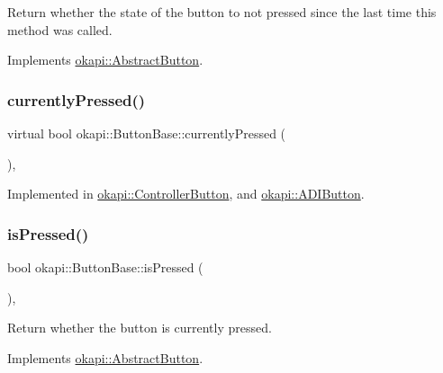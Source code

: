 Return whether the state of the button to not pressed since the last time this method was called. 

Implements \mbox{\hyperlink{classokapi_1_1AbstractButton_ab4f7a216d6d0a9d14bb89705df0327b3}{okapi\+::\+Abstract\+Button}}.

\mbox{\label{classokapi_1_1ButtonBase_a748b6f2b5ebce9fa9f6bbc9d170d3d7a}} 
\subsubsection{\texorpdfstring{currentlyPressed()}{currentlyPressed()}}
{\footnotesize\ttfamily virtual bool okapi\+::\+Button\+Base\+::currently\+Pressed (\begin{DoxyParamCaption}{ }\end{DoxyParamCaption})\hspace{0.3cm}{\ttfamily [protected]}, {}}



Implemented in \mbox{\hyperlink{classokapi_1_1ControllerButton_a35ee73925d03c31b19568530248c0892}{okapi\+::\+Controller\+Button}}, and \mbox{\hyperlink{classokapi_1_1ADIButton_af37e345e8239a572021c0b0b31f859aa}{okapi\+::\+A\+D\+I\+Button}}.

\mbox{\label{classokapi_1_1ButtonBase_a82f27002395801e0d1a6c3213b6454f4}} 
\subsubsection{\texorpdfstring{isPressed()}{isPressed()}}
{\footnotesize\ttfamily bool okapi\+::\+Button\+Base\+::is\+Pressed (\begin{DoxyParamCaption}{ }\end{DoxyParamCaption})\hspace{0.3cm}{\ttfamily [override]}, {\ttfamily [virtual]}}

Return whether the button is currently pressed. 

Implements \mbox{\hyperlink{classokapi_1_1AbstractButton_aea582f04f6ec3f5714b285421d2db66e}{okapi\+::\+Abstract\+Button}}.



